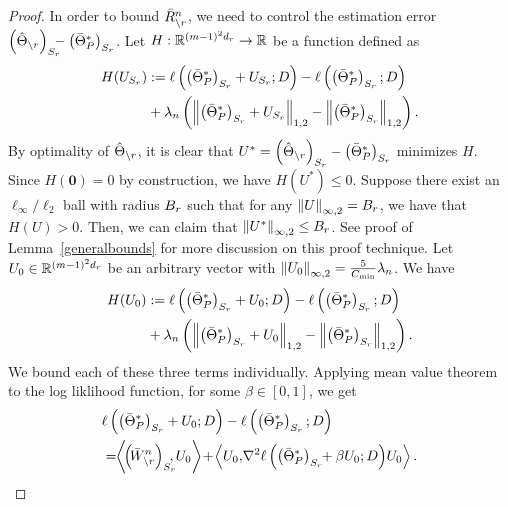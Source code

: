\begin{proof}
\noindent In order to bound $\bar{R}^n_{\backslash r}$, we need to control the estimation error $\left(\hat{\Theta}_{\backslash r}\right)_{S_{r}}\!\!\!\! -\left(\bar{\Theta}^*_P\right)_{S_{r}}$. Let $H:\mathbb{R}^{(m-1)^2d_{r}}\rightarrow\mathbb{R}$ be a function defined as
\begin{equation}
\begin{aligned}
H(U_{S_{r}})&:=\ell\left(\left(\bar{\Theta}^*_P\right)_{S_{r}}+U_{S_{r}};D\right) -\ell\left(\left(\bar{\Theta}^*_P\right)_{S_{r}};D\right)\\ &+\lambda_n\left(\left\|\left(\bar{\Theta}^*_P\right)_{S_{r}}+U_{S_{r}}\right\|_{1,2} -\left\|\left(\bar{\Theta}^*_P\right)_{S_{r}}\right\|_{1,2}\right). 
\end{aligned}
\nonumber
\end{equation}
By optimality of $\hat{\Theta}_{\backslash r}$, it is clear that  $U^*=\left(\hat{\Theta}_{\backslash r}\right)_{S_{r}} -\left(\bar{\Theta}^*_P\right)_{S_{r}}$ minimizes $H$. Since $H(\mathbf{0})=0$ by construction, we have $H(U^*)\leq 0$. Suppose there exist an $\ell_\infty/\ell_2$ ball with radius $B_{r}$ such that for any $\left\|U\right\|_{\infty,2}=B_{r}$, we have that $H(U)>0$. Then, we can claim that $\left\|U^*\right\|_{\infty,2}\leq B_{r}$. See proof of Lemma~\ref{generalbounds} for more discussion on this proof technique. Let $U_0\in\mathbb{R}^{(m-1)^2d_{r}}$ be an arbitrary vector with $\left\|U_0\right\|_{\infty,2}=\frac{5}{C_{\min}}\lambda_n$. We have
\begin{equation}
\begin{aligned}
H(U_0)&:=\ell\left(\left(\bar{\Theta}^*_P\right)_{S_{r}}+U_0;D\right) -\ell\left(\left(\bar{\Theta}^*_P\right)_{S_{r}};D\right)\\ &+\lambda_n\left(\left\|\left(\bar{\Theta}^*_P\right)_{S_{r}}+U_0\right\|_{1,2} -\left\|\left(\bar{\Theta}^*_P\right)_{S_{r}}\right\|_{1,2}\right). 
\end{aligned}
\label{Hu_Eqn}
\end{equation}
We bound each of these three terms individually. Applying mean value theorem to the log liklihood function, for some $\beta\in[0,1]$, we get
\begin{equation}
\begin{aligned}
&\ell\left(\left(\bar{\Theta}^*_P\right)_{\support_\svert}+U_0;D\right) -\ell\left(\left(\bar{\Theta}^*_P\right)_{\support_\svert};D\right)\\ &=\!\! \tr{\!\left(\!\bar{W}^n_{\backslash\svert}\right)_{\support_\svert}\!\!\!\!}{U_0}\! +\!\tr{U_0}{\!\nabla^2\ell\left(\left(\bar{\Theta}^*_P\right)_{\support_\svert}\!\!+\beta U_0;D\right)\!U_0}.

\end{aligned}
\end{equation}
\end{proof}
